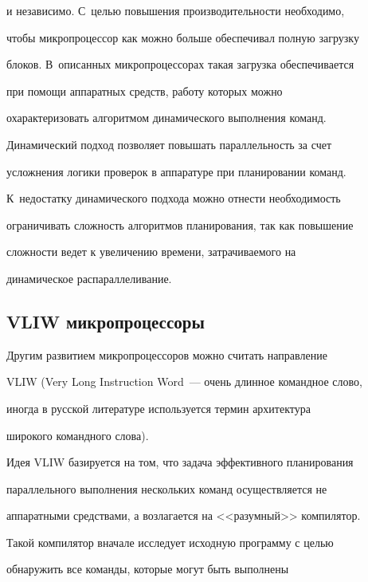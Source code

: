 и независимо. С~целью повышения производительности необходимо, 


чтобы микропроцессор как можно больше обеспечивал полную загрузку 


блоков. В~описанных микропроцессорах такая загрузка обеспечивается  


при помощи аппаратных средств, работу которых можно 


охарактеризовать алгоритмом динамического выполнения команд. 





Динамический подход позволяет повышать параллельность за счет 


усложнения логики проверок в аппаратуре при планировании команд. 


К~недостатку динамического подхода можно отнести необходимость 


ограничивать сложность алгоритмов планирования, так как повышение 


сложности ведет к увеличению времени, затрачиваемого на 


динамическое распараллеливание.





\subsection{VLIW микропроцессоры}





Другим развитием микропроцессоров можно считать направление 


VLIW (Very Long Instruction Word~--- очень длинное командное слово, 


иногда в русской литературе используется термин архитектура 


широкого командного слова).


  


 Идея VLIW базируется на том, что задача эффективного планирования 


параллельного выполнения нескольких команд осуществляется не 


аппаратными средствами, а возлагается на <<разумный>> компилятор. 


Такой компилятор вначале исследует исходную программу с целью 


обнаружить все команды, которые могут быть выполнены 


